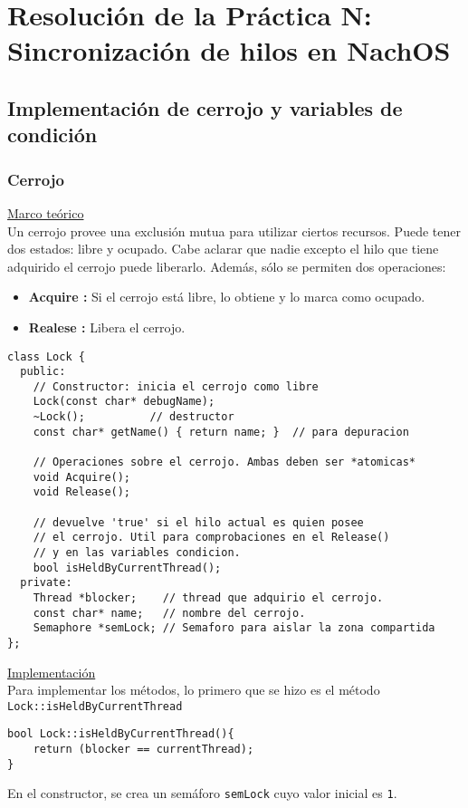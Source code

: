 \chapter{Resolución de la Práctica N: Sincronización de hilos en NachOS}
\section{Implementación de cerrojo y variables de condición}
\subsection*{Cerrojo}
\textsf{\underline{Marco teórico}}\\
Un cerrojo provee una exclusión mutua para utilizar ciertos recursos. Puede tener dos estados: libre y ocupado. Cabe aclarar que nadie excepto el hilo que tiene adquirido el cerrojo puede liberarlo. Además, sólo se permiten dos operaciones:
\begin{itemize}
	\item \textbf{Acquire :} Si el cerrojo está libre, lo obtiene y lo marca como ocupado.
	\item \textbf{Realese :} Libera el cerrojo.
\end{itemize}
\begin{lstlisting}[style=C]
class Lock {
  public:
	// Constructor: inicia el cerrojo como libre
  	Lock(const char* debugName);
  	~Lock();          // destructor
  	const char* getName() { return name; }	// para depuracion

  	// Operaciones sobre el cerrojo. Ambas deben ser *atomicas*
  	void Acquire(); 
  	void Release();

  	// devuelve 'true' si el hilo actual es quien posee
  	// el cerrojo. Util para comprobaciones en el Release()
  	// y en las variables condicion.
  	bool isHeldByCurrentThread();
  private:
    Thread *blocker; 	// thread que adquirio el cerrojo.
    const char* name;	// nombre del cerrojo.
    Semaphore *semLock; // Semaforo para aislar la zona compartida
};
\end{lstlisting}
\textsf{\underline{Implementación}}\\
Para implementar los métodos, lo primero que se hizo es el método \texttt{Lock::isHeldByCurrentThread}
\begin{lstlisting}[style=C]
bool Lock::isHeldByCurrentThread(){
    return (blocker == currentThread);
}
\end{lstlisting}
En el constructor, se crea un semáforo \texttt{semLock} cuyo valor inicial es \texttt{1}.\\
